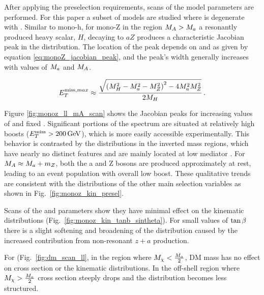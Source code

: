 After applying the preselection requirements, scans of the model parameters are performed.  For this paper a subset of models are studied where \mA is degenerate with \mH.  Similar to mono-h, for mono-Z in the region $M_{A}>M_{a}$ a resonantly produced heavy scalar, $H$, decaying to $aZ$ produces a characteristic Jacobian peak in the \MET distribution.  The location of the peak depends on \mH and \ma as given by equation \ref{eq:monoZ_jacobian_peak}, and the peak's width generally increases with values of  $M_{a}$ and $M_{A}$.  

\begin{align}
E^{\mathrm{miss},max}_T \approx \frac{\sqrt{\left(M_{H}^2 -M_{a}^2 -M_{Z}^2\right)^2 - 4 M_{a}^2 M_{Z}^2}}{2M_{H}}\,.
\label{eq:monoZ_jacobian_peak}
\end{align}

Figure \ref{fig:monoz_ll_mA_scan} shows the Jacobian peaks for increasing values of \mH and fixed \ma.  Significant portions of the spectrum are situated at relatively high boosts ($\MET>\unit[200]{GeV}$), which is more easily accessible experimentally.  This behavior is contrasted by the distributions in the inverted mass regions, which have nearly no distinct features and are mainly located at low mediator \pt. For $M_{A}\approx M_{a}+m_{Z}$, both the a and Z bosons are produced approximately at rest, leading to an event population with overall low boost. These qualitative trends are consistent with the distributions of the other main selection variables as shown in Fig.~\ref{fig:monoz_kin_presel}.

Scans of the \tanb and \sinp parameters show they have minimal effect on the kinematic distributions (Fig.~\ref{fig:monoz_kin_tanb_sintheta}).  For small values of $\tan\beta$ there is a slight softening and broadening of the \MET distribution caused by the increased contribution from non-resonant $z+a$ production.

For \mDM (Fig.~\ref{fig:dm_scan_ll}, in the region where $M_{\chi} < \frac{M_{a}}{2}$, DM mass has no effect on cross section or the kinematic distributions.  In the off-shell region where  $M_{\chi} > \frac{M_{a}}{2}$ cross section steeply drops and the \MET distribution becomes less structured.




